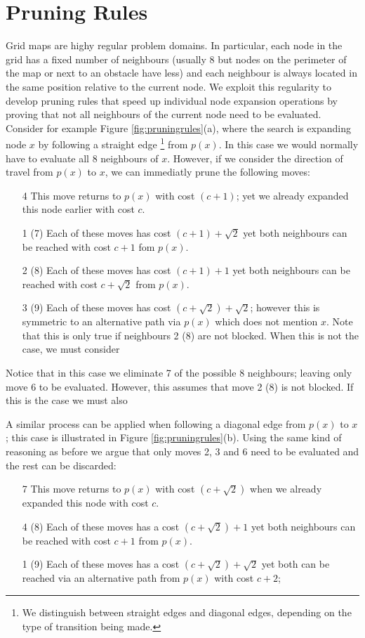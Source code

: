 \section{Pruning Rules}
Grid maps are highy regular problem domains. 
In particular, each node in the grid has a fixed number of neighbours (usually
8 but nodes on the perimeter of the map or next to an obstacle have less) and each
neighbour is always located in the same position relative to the current node.
We exploit this regularity to develop pruning rules that speed up individual 
node expansion operations by proving that not all neighbours of the current node 
need to be evaluated. 
Consider for example Figure \ref{fig:pruningrules}(a), where the search is
expanding node $x$ by following a straight edge \footnote{We distinguish between
straight edges and diagonal edges, depending on the type of transition being
made.} from $p(x)$.
In this case we would normally have to evaluate all 8 neighbours of $x$.
However, if we consider the direction of travel from $p(x)$ to $x$, we can 
immediatly prune the following moves:
\renewcommand{\descriptionlabel}[1]%
{{\labelsep}\textsf{#1}}
\begin{enumerate}
\item[4    ] This move returns to $p(x)$ with cost $(c + 1)$; 
yet we already expanded this node earlier with cost $c$. 
\item[1 (7)] Each of these moves has cost $(c + 1) + \sqrt2$ yet both neighbours
can be reached with cost $c + 1$ fom $p(x)$.
\item[2 (8)] Each of these moves has cost $(c + 1) + 1$ yet both neighbours can
be reached with cost $c + \sqrt2$ from $p(x)$.
\item[3 (9)] Each of these moves has cost $(c + \sqrt2) + \sqrt2$; however this is
symmetric to an alternative path via $p(x)$ which does not mention $x$.
Note that this is only true if neighbours 2 (8) are not blocked. 
When this is not the case, we must consider
\end{enumerate}

Notice that in this case we eliminate 7 of the possible 8 neighbours; leaving
only move 6 to be evaluated. However, this assumes that move 2 (8) is not
blocked. If this is the case we must also 

A similar process can be applied when following a diagonal edge from $p(x)$ to 
$x$; this case is illustrated in Figure \ref{fig:pruningrules}(b).
Using the same kind of reasoning as before we argue that only moves 2, 3 and 6
need to be evaluated and the rest can be discarded:
\begin{enumerate}
\item[7    ] This move returns to $p(x)$ with cost $(c + \sqrt2)$ when we already
expanded this node with cost $c$.
\item[4 (8)] Each of these moves has a cost $(c + \sqrt2) + 1$ yet both
neighbours can be reached with cost $c + 1$ from $p(x)$.
\item[1 (9)] Each of these moves has a cost $(c + \sqrt2) + \sqrt2$ yet both
can be reached via an alternative path from $p(x)$ with cost $c + 2$;
\end{enumerate}

